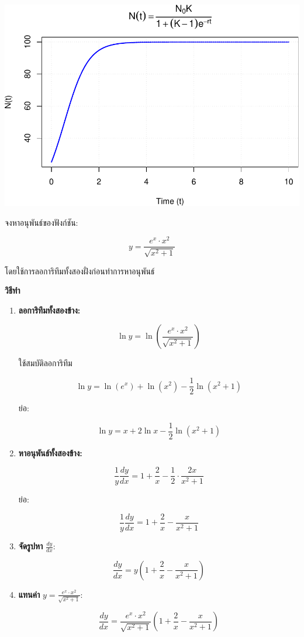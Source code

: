 \documentclass[
]{book}
\begin{document}
\includegraphics{SCMA104bookdownproj_files/figure-latex/graph-logistic equation-1.pdf}

จงหาอนุพันธ์ของฟังก์ชัน:

\[ y = \frac{e^x \cdot x^2}{\sqrt{x^2 + 1}} \]

โดยใช้การลอการิทึมทั้งสองฝั่งก่อนทำการหาอนุพันธ์

\textbf{วิธีทำ}

\begin{enumerate}
\def\labelenumi{\arabic{enumi}.}
\item
  \textbf{ลอการิทึมทั้งสองข้าง:}

  \[ \ln y = \ln\left( \frac{e^x \cdot x^2}{\sqrt{x^2 + 1}} \right) \]

  ใช้สมบัติลอการิทึม

  \[ \ln y = \ln(e^x) + \ln(x^2) - \frac{1}{2} \ln(x^2 + 1) \]

  ย่อ:

  \[ \ln y = x + 2 \ln x - \frac{1}{2} \ln(x^2 + 1) \]
\item
  \textbf{หาอนุพันธ์ทั้งสองข้าง:}

  \[ \frac{1}{y} \frac{dy}{dx} = 1 + \frac{2}{x} - \frac{1}{2} \cdot \frac{2x}{x^2 + 1} \]

  ย่อ:

  \[ \frac{1}{y} \frac{dy}{dx} = 1 + \frac{2}{x} - \frac{x}{x^2 + 1} \]
\item
  \textbf{จัดรูปหา} \(\frac{dy}{dx}\):

  \[ \frac{dy}{dx} = y \left( 1 + \frac{2}{x} - \frac{x}{x^2 + 1} \right) \]
\item
  \textbf{แทนค่า} \(y = \frac{e^x \cdot x^2}{\sqrt{x^2 + 1}}\):

  \[ \frac{dy}{dx} = \frac{e^x \cdot x^2}{\sqrt{x^2 + 1}} \left( 1 + \frac{2}{x} - \frac{x}{x^2 + 1} \right) \]
\end{enumerate}
\end{document}
